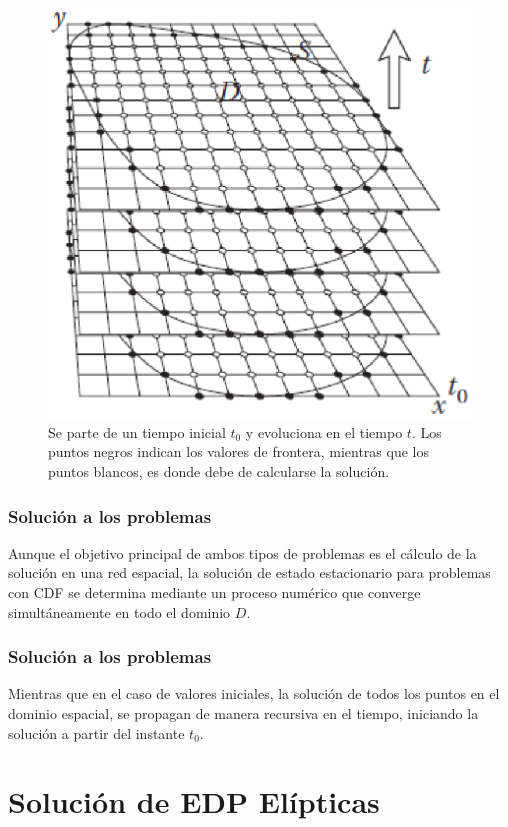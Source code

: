 {\begin{frame}
\begin{figure}
	\includegraphics[scale=0.45]{Imagenes/condicionesEDP_02.eps}
	\caption{Se parte de un tiempo inicial $t_{0}$ y evoluciona en el tiempo $t$. Los puntos negros indican los valores de frontera, mientras que los puntos blancos, es donde debe de calcularse la solución.}
\end{figure}
\end{frame}
}
\begin{frame}
\frametitle{Solución a los problemas}
Aunque el objetivo principal de ambos tipos de problemas es el cálculo de la solución en una red espacial, la solución de estado estacionario para problemas con CDF se determina mediante un proceso numérico que converge simultáneamente en todo el dominio $D$.
\end{frame}
\begin{frame}
\frametitle{Solución a los problemas}
Mientras que en el caso de valores iniciales, la solución de todos los puntos en el dominio espacial, se propagan de manera recursiva en el tiempo, iniciando la solución a partir del instante $t_{0}$.
\end{frame}
\section{Solución de EDP Elípticas}
